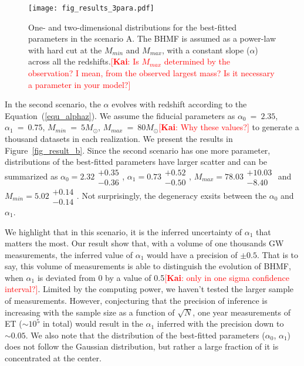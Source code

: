 \documentclass[twocolumn]{aastex62}
\newcommand{\kai}[1]{\textcolor{red}{[{\bf Kai}: #1]}}
\begin{document}
\begin{figure}%
\texttt{[image: fig\_results\_3para.pdf]}
\caption{
One- and two-dimensional distributions for the best-fitted parameters in the scenario A. The BHMF is assumed as a power-law with hard cut at the $M_{min}$ and $M_{max}$, with a constant slope ($\alpha$) across all the redshifts.\kai{Is $M_{max}$ determined by the observation? I mean, from
the observed largest mass? Is it necessary a parameter in your model?}
}
\label{fig_result_a}
\end{figure}

In the second scenario, the $\alpha$ evolves with redshift according to the Equation~(\ref{equ_alphaz}). We assume the fiducial parameters as $\alpha_0~=~2.35$, $\alpha_1~=~0.75$, $M_{min}~=~5M_{\odot}$, $M_{max}~=~80M_{\odot}$\kai{Why these values?} to generate a thousand datasets in each realization. We present the results in Figure~\ref{fig_result_b}. Since the second scenario has one more parameter, distributions of the best-fitted parameters have larger scatter and can be summarized as $\alpha_0 = 2.32\substack{+0.35\\-0.36}$, $\alpha_1 = 0.73\substack{+0.52\\-0.50}$, $M_{max} = 78.03\substack{+10.03\\-8.40}$ and  $M_{min} = 5.02\substack{+0.14\\-0.14}$. Not surprisingly, the degeneracy exsits between the $\alpha_0$ and $\alpha_1$. 

We highlight that in this scenario, it is the inferred uncertainty of $\alpha_1$ that matters the most. Our result show that, with a volume of one thousands GW measurements, the inferred value of $\alpha_1$ would have a precision of $\pm0.5$. That is to say, this volume of measurements is able to distinguish the evolution of BHMF, when $\alpha_1$ is deviated from 0 by a value of 0.5\kai{only in one sigma confidence interval?}. Limited by the computing power, we haven't tested the larger sample of measurements. However, conjecturing that the precision of inference is increasing with the sample size as a function of $\sqrt{N}$, one year measurements of ET ($\sim10^5$ in total) would result in the $\alpha_1$ inferred with the precision down to $\sim0.05$.
We also note that the distribution of the best-fitted parameters ($\alpha_0$, $\alpha_1$) does not follow the Gaussian distribution, but rather a large fraction of it is concentrated at the center. 
\end{document}
